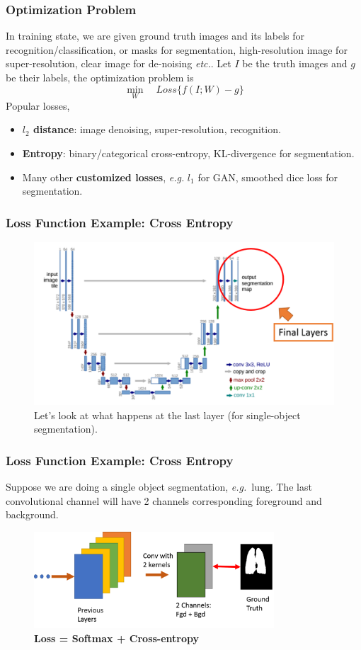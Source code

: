 \documentclass[10pt]{beamer}
\newcommand{\etc}{{\it etc.}}
\newcommand{\eg}{{\it e.g.}}
\begin{document}
\begin{frame}
\frametitle{Optimization Problem}
In training state, we are given ground truth images and its labels for recognition/classification, or masks for segmentation, high-resolution image for super-resolution, clear image for de-noising \etc. 
\vskip 0.2in
Let $I$ be the truth images and $g$ be their labels, the optimization problem is 
\[
\min_W \quad Loss\{ f(I; W) - g\}
\] 
Popular losses,
\begin{itemize}
	\item \textbf{$l_2$ distance}: image denoising, super-resolution, recognition.
	\item \textbf{Entropy}: binary/categorical cross-entropy, KL-divergence for segmentation.
	\item Many other \textbf{customized losses}, \eg \text{ } $l_1$ for GAN, smoothed dice loss for segmentation.
\end{itemize}
\end{frame}

\begin{frame}
\frametitle{Loss Function Example: Cross Entropy}
	\begin{figure}[H]
	\centerline{
		\includegraphics[width=1\textwidth]{loss_last_layer.png}
	}
	\caption{Let's look at what happens at the last layer (for single-object segmentation).}
	\end{figure}
\end{frame}

\begin{frame}
\frametitle{Loss Function Example: Cross Entropy}
Suppose we are doing a single object segmentation, \eg\ lung. The last convolutional channel will have 2 channels corresponding foreground and background. 
	\begin{figure}[H]
	\centerline{
		\includegraphics[width=0.8\textwidth]{last_layer.png}
	}
	\caption{\textbf{Loss = Softmax + Cross-entropy}}
	\end{figure} 
\end{frame}
\end{document}
